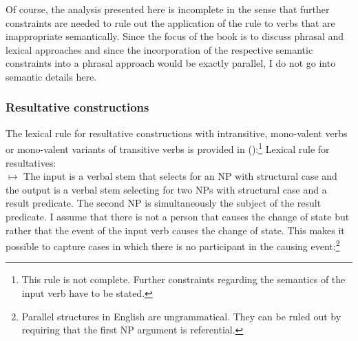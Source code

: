 Of course, the analysis presented here is incomplete in the sense that further constraints are
needed to rule out the application of the rule to verbs that are inappropriate semantically. Since
the focus of the book is to discuss phrasal and lexical approaches and since the incorporation of
the respective semantic constraints into a phrasal approach would be exactly parallel, I do not go
into semantic details here.

\subsubsection{Resultative constructions}

The lexical rule for resultative constructions with intransitive, mono-valent verbs or mono-valent variants of
transitive verbs is provided in ():\footnote{%
  This rule is not complete. Further constraints regarding the semantics of the input verb have to
  be stated.%
}
\ea
Lexical rule for resultatives:\\
$\mapsto$
\z
The input is a verbal stem that selects for an NP with structural case and the output is a verbal
stem selecting for two NPs with structural case and a result predicate. The second NP is
simultaneously the subject of the result predicate. I assume that there is not a person that causes
the change of state but rather that the event of the input verb  causes the change of
state. This makes it possible to capture cases in which there is no participant in the causing
event:\footnote{%
   Parallel structures in English are ungrammatical. They can be ruled out by requiring that the
   first NP argument is referential.
}

